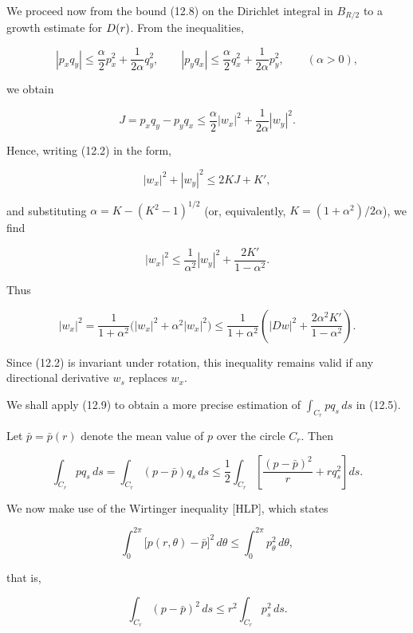 \noindent We proceed now from the bound (12.8) on the Dirichlet integral in $B_{R/2}$ to a
growth estimate for $D(r)$. From the inequalities,

\[
|p_xq_y|\leq \frac{\alpha}{2}p_x^2+\frac{1}{2\alpha}q_y^2,\qquad |p_yq_x|\leq \frac{\alpha}{2}q_x^2+\frac{1}{2\alpha}p_y^2,\qquad (\alpha>0),
\]

\noindent we obtain

\[
J=p_xq_y-p_yq_x\leq \frac{\alpha}{2}|w_x|^2+\frac{1}{2\alpha}|w_y|^2.
\]

\noindent Hence, writing (12.2) in the form,

\[
|w_x|^2+|w_y|^2\leq 2KJ+K',
\]



and substituting $\alpha = K - (K^2 - 1)^{1/2}$ (or, equivalently, $K = (1 + \alpha^2)/2\alpha$), we find

\[
|w_x|^2 \leq \frac{1}{\alpha^2}|w_y|^2 + \frac{2K'}{1 - \alpha^2}.
\]

Thus

\begin{equation}
|w_x|^2 = \frac{1}{1+\alpha^2}\bigl(|w_x|^2 + \alpha^2|w_x|^2\bigr)
\leq \frac{1}{1+\alpha^2}\left(|Dw|^2 + \frac{2\alpha^2K'}{1-\alpha^2}\right).
\tag{12.9}
\end{equation}

Since (12.2) is invariant under rotation, this inequality remains valid if any directional derivative $w_s$ replaces $w_x$.

We shall apply (12.9) to obtain a more precise estimation of $\int_{C_r} p q_s\, ds$ in (12.5).

Let $\bar p = \bar p(r)$ denote the mean value of $p$ over the circle $C_r$. Then

\begin{equation}
\int_{C_r} p q_s\, ds = \int_{C_r} (p-\bar p)q_s\, ds \leq \frac{1}{2}\int_{C_r}\left[\frac{(p-\bar p)^2}{r} + r q_s^2\right] ds.
\tag{12.10}
\end{equation}

We now make use of the Wirtinger inequality [HLP], which states

\[
\int_0^{2\pi}\bigl[p(r,\theta)-\bar p\bigr]^2\, d\theta \leq \int_0^{2\pi} p_\theta^2\, d\theta,
\]

that is,

\begin{equation}
\int_{C_r} (p-\bar p)^2\, ds \leq r^2 \int_{C_r} p_s^2\, ds.
\tag{12.11}
\end{equation}

